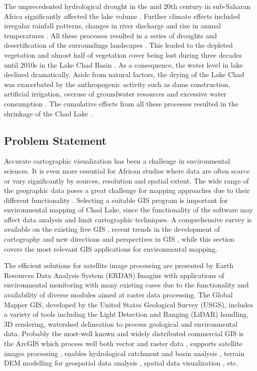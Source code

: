 \documentclass[geosciences,article,submit,pdftex,moreauthors]{Definitions/mdpi}
\begin{document}
The unprecedented hydrological drought in the mid 20th century in sub-Saharan Africa significantly affected the lake volume \cite{Nzango}. Further climate effects included irregular rainfall patterns, changes in river discharge and rise in annual temperatures \cite{Pattnayak}. All these processes resulted in a series of droughts and desertification of the surroundings landscapes \cite{NWILO2020104190}. This leaded to the depleted vegetation and almost half of vegetation cover being lost during three decades until 2010s in the Lake Chad Basin \cite{NWILO2020104190}. As a consequence, the water level in lake declined dramatically. Aside from natural factors, the drying of the Lake Chad was exacerbated by the anthropogenic activity such as dams construction, artificial irrigation, overuse of groundwater resources and excessive water consumption \cite{Yaoetal,fishes8020064}. The cumulative effects from all these processes resulted in the shrinkage of the Chad Lake \cite{RIEBE2021104486}.  

\subsection{Problem Statement}

Accurate cartographic visualization has been a challenge in environmental sciences. It is even more essential for African studies where data are often scarce or vary significantly by sources, resolution and spatial extent. The wide range of the geographic data poses a great challenge for mapping approaches due to their different functionality \cite{STEINIGER2013136}. Selecting a suitable GIS program is important for environmental mapping of Chad Lake, since the functionality of the software may affect data analysis and limit cartographic techniques. A comprehensive survey is available on the existing free GIS \cite{LEIDIG201549,CHEN2010253}, recent trends in the development of cartography \cite{WangWu} and new directions and perspectives in GIS \cite{Lietal2022}, while this section covers the most relevant GIS applications for environmental mapping.

The efficient solutions for satellite image processing are presented by Earth Resources Data Analysis System (ERDAS) Imagine with applications of environmental monitoring \cite{FALAKI2020363} with many existing cases due to the functionality and availability of diverse modules aimed at raster data processing. The Global Mapper GIS, developed by the United States Geological Survey (USGS), includes a variety of tools including the Light Detection and Ranging (LiDAR) handling, 3D rendering, watershed delineation to process geological and environmental data. Probably the most-well known and widely distributed commercial GIS is the ArcGIS which process well both vector and raster data \cite{AlDjazouli}, supports satellite images processing \cite{SESNIE20082145}, enables hydrological catchment and basin analysis \cite{Nkiaka}, terrain DEM modelling for geospatial data analysis \cite{Kay}, spatial data visualization \cite{GHIENNE200281,Buenzli,Gachet}, etc. 
\end{document}
